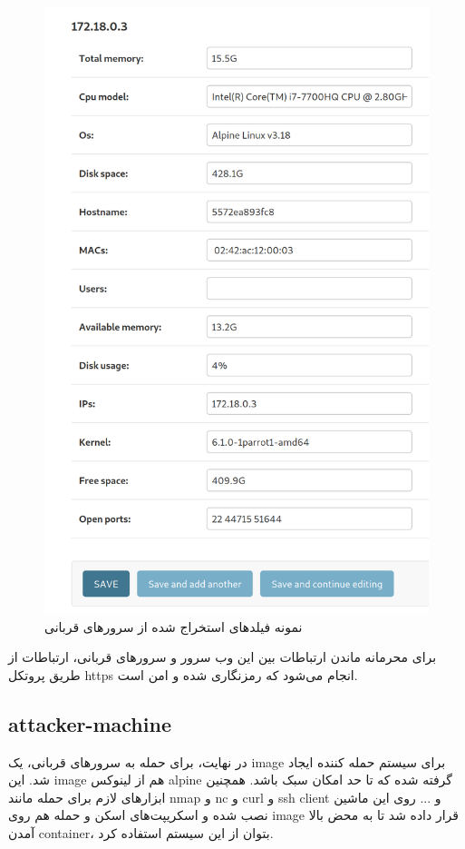 \documentclass[11pt]{article}
\begin{document}
\begin{figure}[hbtp]
\caption{نمونه فیلدهای استخراج شده از سرورهای قربانی}
\centering
\includegraphics[scale=0.2]{images/host_security_info.png}
\end{figure}


برای محرمانه ماندن ارتباطات بین این وب سرور و سرورهای قربانی، ارتباطات از طریق پروتکل https انجام می‌شود که رمزنگاری شده و امن است.

\subsection{attacker-machine}
در نهایت، برای حمله به سرورهای قربانی، یک image برای سیستم حمله کننده ایجاد شد. این image هم از لینوکس alpine گرفته شده که تا حد امکان سبک باشد. همچنین ابزارهای لازم برای حمله مانند nmap و nc و curl و ssh client و ... روی این ماشین نصب شده و اسکریپت‌های اسکن و حمله هم روی image قرار داده شد تا به محض بالا آمدن container، بتوان از این سیستم استفاده کرد.
\end{document}
